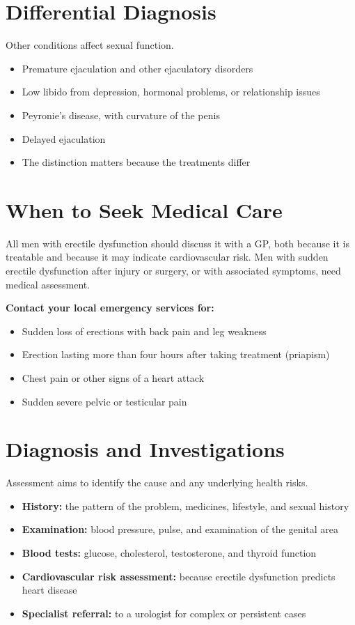 \section*{Differential Diagnosis}
Other conditions affect sexual function.
\begin{itemize}
    \item Premature ejaculation and other ejaculatory disorders
    \item Low libido from depression, hormonal problems, or relationship issues
    \item Peyronie's disease, with curvature of the penis
    \item Delayed ejaculation
    \item The distinction matters because the treatments differ
\end{itemize}

\section*{When to Seek Medical Care}
All men with erectile dysfunction should discuss it with a GP, both because it is treatable and because it may indicate cardiovascular risk. Men with sudden erectile dysfunction after injury or surgery, or with associated symptoms, need medical assessment.

\textbf{Contact your local emergency services for:}
\begin{itemize}
    \item Sudden loss of erections with back pain and leg weakness
    \item Erection lasting more than four hours after taking treatment (priapism)
    \item Chest pain or other signs of a heart attack
    \item Sudden severe pelvic or testicular pain
\end{itemize}

\section*{Diagnosis and Investigations}
Assessment aims to identify the cause and any underlying health risks.
\begin{itemize}
    \item \textbf{History:} the pattern of the problem, medicines, lifestyle, and sexual history
    \item \textbf{Examination:} blood pressure, pulse, and examination of the genital area
    \item \textbf{Blood tests:} glucose, cholesterol, testosterone, and thyroid function
    \item \textbf{Cardiovascular risk assessment:} because erectile dysfunction predicts heart disease
    \item \textbf{Specialist referral:} to a urologist for complex or persistent cases
\end{itemize}

